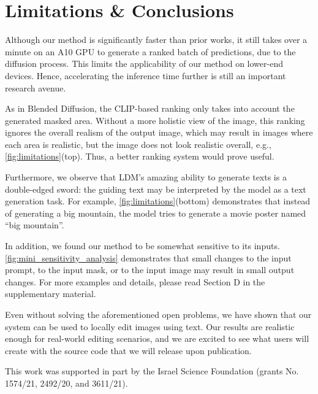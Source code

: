 \section{Limitations \& Conclusions}
\label{sec:limitations}

Although our method is significantly faster than prior works, it still takes over a minute on an A10 GPU to generate a ranked batch of predictions, due to the diffusion process. This limits the applicability of our method on lower-end devices. Hence, accelerating the inference time further is still an important research avenue.  

As in Blended Diffusion, the CLIP-based ranking only takes into account the generated masked area. Without a more holistic view of the image, this ranking ignores the overall realism of the output image, which may result in images where each area is realistic, but the image does not look realistic overall, e.g., \ref{fig:limitations}(top). Thus, a better ranking system would prove useful.

Furthermore, we observe that LDM's amazing ability to generate texts is a double-edged sword: the guiding text may be interpreted by the model as a text generation task. For example, \ref{fig:limitations}(bottom) demonstrates that instead of generating a big mountain, the model tries to generate a movie poster named ``big mountain''.

In addition, we found our method to be somewhat sensitive to its inputs. \ref{fig:mini_sensitivity_analysis} demonstrates that small changes to the input prompt, to the input mask, or to the input image may result in small output changes. For more examples and details, please read Section D in the supplementary material.

Even without solving the aforementioned open problems, we have shown that our system can be used to locally edit images using text. Our results are realistic enough for real-world editing scenarios, and we are excited to see what users will create with the source code that we will release upon publication.

\begin{acks}
    This work was supported in part by the Israel Science Foundation (grants No. 1574/21, 2492/20, and 3611/21).
\end{acks}

